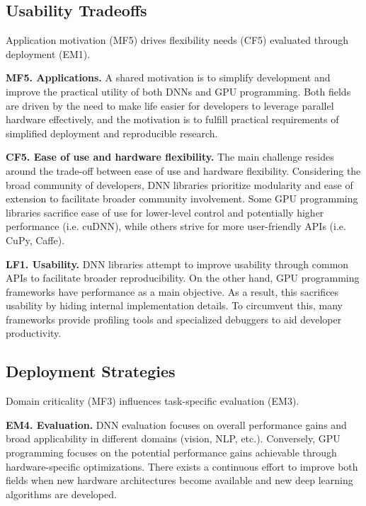 \subsection*{Usability Tradeoffs}
Application motivation (MF5) drives flexibility needs (CF5) evaluated through deployment (EM1).

\textbf{MF5. Applications.}
A shared motivation is to simplify development and improve the practical utility of both DNNs and
GPU programming. Both fields are driven by the need to make life easier for developers to leverage
parallel hardware effectively, and the motivation is to fulfill practical requirements of
simplified deployment and reproducible research.

\textbf{CF5. Ease of use and hardware flexibility.}
The main challenge resides around the trade-off between ease of use and hardware flexibility.
Considering the broad community of developers, DNN libraries prioritize modularity and ease of
extension to facilitate broader community involvement. Some GPU programming libraries sacrifice
ease of use for lower-level control and potentially higher performance (i.e. cuDNN), while others
strive for more user-friendly APIs (i.e. CuPy, Caffe).

\textbf{LF1. Usability.}
DNN libraries attempt to improve usability through common APIs to facilitate broader
reproducibility. On the other hand, GPU programming frameworks have performance as a main objective.
As a result, this sacrifices usability by hiding internal implementation details. To circumvent this,
many frameworks provide profiling tools and specialized debuggers to aid developer productivity.

\subsection*{Deployment Strategies}
Domain criticality (MF3) influences task-specific evaluation (EM3).

\textbf{EM4. Evaluation.}
DNN evaluation focuses on overall performance gains and broad applicability in different domains (vision,
NLP, etc.). Conversely, GPU programming focuses on the potential performance gains achievable through
hardware-specific optimizations. There exists a continuous effort to improve both fields when new
hardware architectures become available and new deep learning algorithms are developed.

